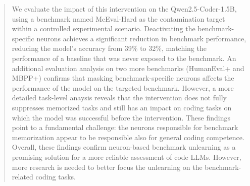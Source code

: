 \documentclass[mscthesis]{usiinfthesis}
\begin{document}
\begin{abstract}
We evaluate the impact of this intervention on the Qwen2.5-Coder-1.5B, using a benchmark named McEval-Hard
as the contamination target within a controlled experimental scenario.
Deactivating the benchmark-specific neurons achieves a significant reduction in benchmark performance,
reducing the model's accuracy from 39\% to 32\%, matching the performance of a baseline that was never exposed to the benchmark.
An additional evaluation analysis on two more benchmarks (HumanEval+ and MBPP+) confirms that masking benchmark-specific neurons affects the performance of the model on the targeted benchmark.
However, a more detailed task-level anaysis reveals that the intervention does not fully
suppresses memorized tasks and still has an impact on coding tasks on which the model was successful before the intervention.
These findings point to a fundamental challenge: the neurons responsible for benchmark
memorization appear to be responsible also for general coding competence.
Overall, these findings confirm neuron-based benchmark unlearning as a promising solution for a more reliable assessment of code LLMs. However, more research is needed to better focus the unlearning on the benchmark-related coding tasks.
\end{abstract}

\tableofcontents 
\listoffigures %
\listoftables %

\mainmatter
\end{document}
